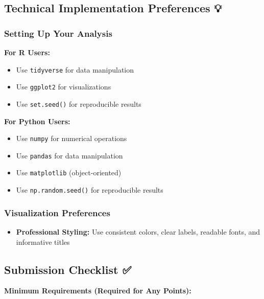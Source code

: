 \documentclass[
  letterpaper,
  DIV=11,
  numbers=noendperiod]{scrartcl}
\providecommand{\tightlist}{%
  \setlength{\itemsep}{0pt}\setlength{\parskip}{0pt}}
\theoremstyle{definition}
\theoremstyle{remark}
\begin{document}
\subsection{Technical Implementation Preferences
💡}\label{technical-implementation-preferences}

\subsubsection{Setting Up Your Analysis}\label{setting-up-your-analysis}

\textbf{For R Users:}

\begin{itemize}
\tightlist
\item
  Use \texttt{tidyverse} for data manipulation
\item
  Use \texttt{ggplot2} for visualizations
\item
  Use \texttt{set.seed()} for reproducible results
\end{itemize}

\textbf{For Python Users:}

\begin{itemize}
\tightlist
\item
  Use \texttt{numpy} for numerical operations
\item
  Use \texttt{pandas} for data manipulation
\item
  Use \texttt{matplotlib} (object-oriented)
\item
  Use \texttt{np.random.seed()} for reproducible results
\end{itemize}

\subsubsection{Visualization
Preferences}\label{visualization-preferences}

\begin{itemize}
\tightlist
\item
  \textbf{Professional Styling:} Use consistent colors, clear labels,
  readable fonts, and informative titles
\end{itemize}

\subsection{Submission Checklist ✅}\label{submission-checklist}

\textbf{Minimum Requirements (Required for Any Points):}
\end{document}
